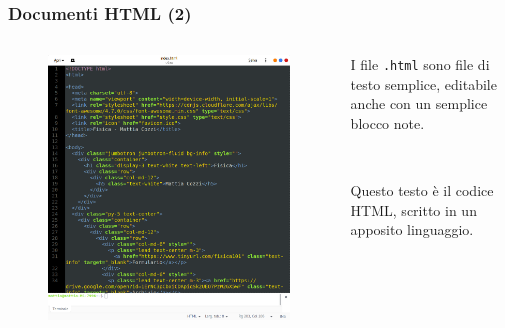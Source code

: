 \documentclass[]{beamer}
\begin{document}
\begin{frame}
\frametitle{Documenti HTML (2)}
\begin{columns}
\begin{column}{0.6\textwidth}
\begin{figure}
\includegraphics[width=\columnwidth]{screenshots/testosemplice.png}
\end{figure}
\end{column}
\begin{column}{0.3\textwidth}
I file \texttt{.html} sono file di \alert{testo semplice}, editabile anche con un semplice blocco note.

~

Questo testo è il \alert{codice HTML}, scritto in un apposito linguaggio.
\end{column}
\end{columns}
\end{frame}
\end{document}
